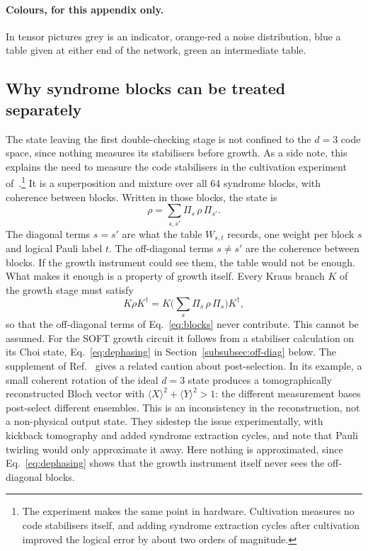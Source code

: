 \paragraph{Colours, for this appendix only.} In tensor pictures \colorbox{black!22}{grey} is an indicator, \colorbox{tnorange!22}{orange-red} a noise distribution, \colorbox{tnblue!22}{blue} a table given at either end of the network, \colorbox{tngreen!22}{green} an intermediate table.

\subsection{Why syndrome blocks can be treated separately}\label{app:E-blocks}
The state leaving the first double-checking stage is not confined to the $d=3$ code space, since nothing measures its stabilisers before growth. As a side note, this explains the need to measure the code stabilisers in the cultivation experiment of~\cite{cultivation_google_expt}.\footnote{The experiment makes the same point in hardware. Cultivation measures no code stabilisers itself, and adding syndrome extraction cycles after cultivation improved the logical error by about two orders of magnitude.}
It is a superposition and mixture over all 64 syndrome blocks, with coherence between blocks.
Written in those blocks, the state is
\begin{equation}
 \rho=\sum_{s,s'}\Pi_s\,\rho\,\Pi_{s'} .
 \label{eq:blocks}
\end{equation}
The diagonal terms $s=s'$ are what the table $W_{s,t}$ records, one weight per block $s$ and logical Pauli label $t$. The off-diagonal terms $s\neq s'$ are the coherence between blocks. If the growth instrument could see them, the table would not be enough. What makes it enough is a property of growth itself. Every Kraus branch $K$ of the growth stage must satisfy
\begin{equation}
 K\rho K^\dagger=K\Big(\sum_s\Pi_s\,\rho\,\Pi_s\Big)K^\dagger ,
 \label{eq:blockreq}
\end{equation}
so that the off-diagonal terms of Eq.~\eqref{eq:blocks} never contribute. This cannot be assumed. For the SOFT growth circuit it follows from a stabiliser calculation on its Choi state, Eq.~\eqref{eq:dephasing} in Section~\ref{subsubsec:off-diag} below. The supplement of Ref.~\cite{cultivation_google_expt} gives a related caution about post-selection. In its example, a small coherent rotation of the ideal $d=3$ state produces a tomographically reconstructed Bloch vector with $\langle X\rangle^2+\langle Y\rangle^2>1$: the different measurement bases post-select different ensembles. This is an inconsistency in the reconstruction, not a non-physical output state. They sidestep the issue experimentally, with kickback tomography and added syndrome extraction cycles, and note that Pauli twirling would only approximate it away. Here nothing is approximated, since Eq.~\eqref{eq:dephasing} shows that the growth instrument itself never sees the off-diagonal blocks.

